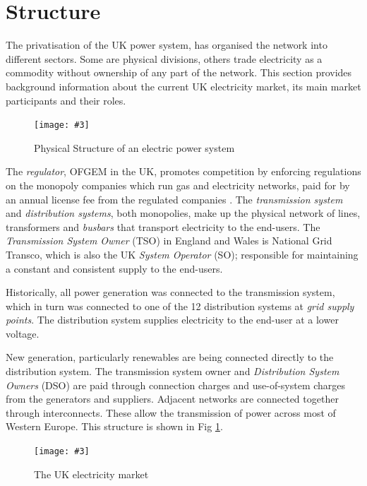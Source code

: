 \documentclass[a4paper,oneside,12pt]{report}
\newcommand{\image}[3] {
  \begin{figure}
    \begin{center}
      \texttt{[image: \#3]}
      \caption{#2}
      \label{#1}
    \end{center}
  \end{figure}
}
\begin{document}
\section{Structure}

The privatisation of the UK power system, has organised the network into different sectors. Some are physical divisions, others trade electricity as a commodity without ownership of any part of the network. This section provides background information about the current UK electricity market, its main market participants and their roles.

\image{physicalstructure}{Physical Structure of an electric power system}{physicalstructure.png}

The \emph{regulator}, OFGEM in the UK, promotes competition by enforcing regulations on the monopoly companies which run gas and electricity networks, paid for by an annual license fee from the regulated companies \cite{OFGEM}. The \emph{transmission system} and \emph{distribution systems}, both monopolies, make up the physical network of lines, transformers and \emph{busbars} that transport electricity to the end-users. The \emph{Transmission System Owner} (TSO) in England and Wales is National Grid Transco, which is also the UK \emph{System Operator} (SO); responsible for maintaining a constant and consistent supply to the end-users.

Historically, all power generation was connected to the transmission system, which in turn was connected to one of the 12 distribution systems at \emph{grid supply points}. The distribution system supplies electricity to the end-user at a lower voltage.

New generation, particularly renewables are being connected directly to the distribution system. The transmission system owner and \emph{Distribution System Owners} (DSO) are paid through connection charges and use-of-system charges from the generators and suppliers. Adjacent networks are connected together through interconnects. These allow the transmission of power across most of Western Europe. This structure is shown in Fig \ref{physicalstructure}.

\image{economicstructure}{The UK electricity market}{economicstructure.png}
\end{document}
